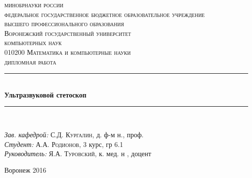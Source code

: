 \begin{titlepage}
\newcommand{\HRule}{\rule{\linewidth}{0.5mm}} %

\center %
 
\textsc {
\footnotesize{
минобрнауки россии\\
федеральное государственное бюджетное образовательное учреждение\\
высшего профессионального образования}\\
\large{Воронежский государственный университет}
}\\[1.0cm] %


\textsc{ компьютерных наук}\\ %
\textsc{\footnotesize010200 Математика и компьютерные науки}\\[1.0cm] 
\textsc{\Large дипломная работа}\\[0.5cm] %



\HRule \\[0.4cm]
{ \huge \bfseries Ультразвуковой стетоскоп}\\[0.4cm] %
\HRule \\[1.5cm]
 


\begin{flushleft} \large
\emph{Зав. кафедрой:} С.Д. \textsc{Кургалин}, д. ф-м н., проф.\\
\emph{Студент:} А.А. \textsc{Родионов}, 3 курс, гр 6.1 \\ %
\emph{Руководитель:} Я.А. \textsc{Туровский}, к. мед. н , доцент %
\end{flushleft}



\vfill %
\begin{center}
Воронеж 2016
\end{center}
\end{titlepage}

